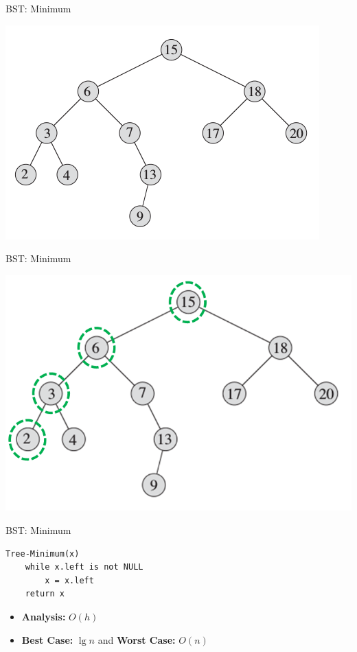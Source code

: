 \documentclass{beamer}
\begin{document}
\begin{frame}{BST: Minimum}

    \begin{center}
        \includegraphics[scale=0.6]{bstMinimum.png}
    \end{center}
\end{frame}


\begin{frame}{BST: Minimum}

    \begin{center}
        \includegraphics[scale=0.5]{bstMinimum2.png}
    \end{center}
\end{frame}

\begin{frame}[fragile]{BST: Minimum}
\begin{verbatim}
Tree-Minimum(x)
    while x.left is not NULL
        x = x.left
    return x
\end{verbatim}
    \begin{itemize}
        \item {\bf Analysis:} $O(h)$ 
        \item {\bf Best Case:} $\lg n$ and {\bf Worst Case:} $O(n)$
    \end{itemize}
\end{frame}
\end{document}
